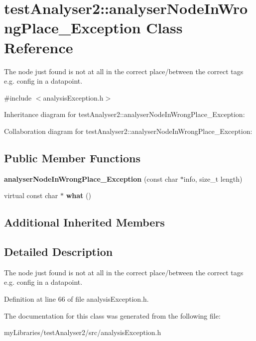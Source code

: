 \hypertarget{classtestAnalyser2_1_1analyserNodeInWrongPlace__Exception}{}\section{test\+Analyser2\+::analyser\+Node\+In\+Wrong\+Place\+\_\+\+Exception Class Reference}
\label{classtestAnalyser2_1_1analyserNodeInWrongPlace__Exception}


The node just found is not at all in the correct place/between the correct tags e.\+g. config in a datapoint.  




{\ttfamily \#include $<$analysis\+Exception.\+h$>$}



Inheritance diagram for test\+Analyser2\+::analyser\+Node\+In\+Wrong\+Place\+\_\+\+Exception\+:


Collaboration diagram for test\+Analyser2\+::analyser\+Node\+In\+Wrong\+Place\+\_\+\+Exception\+:
\subsection*{Public Member Functions}
\begin{DoxyCompactItemize}
\item 
\mbox{\label{classtestAnalyser2_1_1analyserNodeInWrongPlace__Exception_a86cbd86f3e2eb0f1cfdfe800f45b1461}} 
{\bfseries analyser\+Node\+In\+Wrong\+Place\+\_\+\+Exception} (const char $\ast$info, size\+\_\+t length)
\item 
\mbox{\label{classtestAnalyser2_1_1analyserNodeInWrongPlace__Exception_a3804678edd2b00af718d2f943928bbfd}} 
virtual const char $\ast$ {\bfseries what} ()
\end{DoxyCompactItemize}
\subsection*{Additional Inherited Members}


\subsection{Detailed Description}
The node just found is not at all in the correct place/between the correct tags e.\+g. config in a datapoint. 

Definition at line 66 of file analysis\+Exception.\+h.



The documentation for this class was generated from the following file\+:\begin{DoxyCompactItemize}
\item 
my\+Libraries/test\+Analyser2/src/analysis\+Exception.\+h\end{DoxyCompactItemize}
